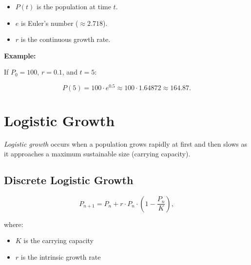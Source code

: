\begin{itemize}

  \item \(P(t)\) is the population at time \(t\).

  \item \(e\) is Euler’s number (\(\approx 2.718\)).

  \item \(r\) is the continuous growth rate.

\end{itemize}

\textbf{Example:}

If \(P_0 = 100\), \(r = 0.1\), and \(t = 5\):

\[
    P(5) = 100 \cdot e^{0.5} \approx 100 \cdot 1.64872 \approx 164.87.
\]

\begin{center}
\end{center}

\section{Logistic Growth}

\emph{Logistic growth} occurs when a population grows rapidly at first and then slows as it approaches a maximum sustainable size (carrying capacity).

\subsection{Discrete Logistic Growth}

\[
    P_{n+1} = P_n + r \cdot P_n \cdot \left(1 - \frac{P_n}{K}\right),
\]

where:

\begin{itemize}

  \item \(K\) is the carrying capacity

  \item \(r\) is the intrinsic growth rate

\end{itemize}

